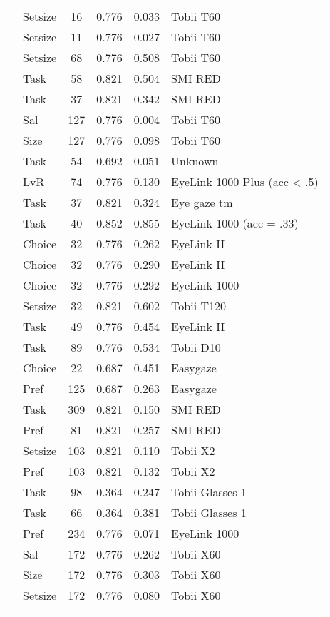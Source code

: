 \begin{longtable}{p{8cm}lcccl}
  \cite{orquin2020osfb} & Setsize & 16 & 0.776 & 0.033 & Tobii T60 \\ 
  \cite{orquin2020osfb} & Setsize & 11 & 0.776 & 0.027 & Tobii T60 \\ 
  \cite{orquin2020osfb} & Setsize & 68 & 0.776 & 0.508 & Tobii T60 \\ 
  \cite{paernamets2015a} & Task & 58 & 0.821 & 0.504 & SMI RED \\ 
  \cite{paernamets2015a} & Task & 37 & 0.821 & 0.342 & SMI RED \\ 
  \cite{peschel2019} & Sal & 127 & 0.776 & 0.004 & Tobii T60 \\ 
  \cite{peschel2019} & Size & 127 & 0.776 & 0.098 & Tobii T60 \\ 
  \cite{pieters1999} & Task & 54 & 0.692 & 0.051 & Unknown \\ 
  \cite{robertson2020} & LvR & 74 & 0.776 & 0.130 & EyeLink 1000 Plus (acc < .5) \\ 
  \cite{rubaltelli2012} & Task & 37 & 0.821 & 0.324 & Eye gaze tm \\ 
  \cite{schoemann2019} & Task & 40 & 0.852 & 0.855 & EyeLink 1000 (acc = .33) \\ 
  \cite{schotter2010a} & Choice & 32 & 0.776 & 0.262 & EyeLink II \\ 
  \cite{schotter2010a} & Choice & 32 & 0.776 & 0.290 & EyeLink II \\ 
  \cite{schotter2012a} & Choice & 32 & 0.776 & 0.292 & EyeLink 1000 \\ 
  \cite{spinks2016a} & Setsize & 32 & 0.821 & 0.602 & Tobii T120 \\ 
  \cite{su2013} & Task & 49 & 0.776 & 0.454 & EyeLink II \\ 
  \cite{turner2014} & Task & 89 & 0.776 & 0.534 & Tobii D10 \\ 
  \cite{vanderlaan2015} & Choice & 22 & 0.687 & 0.451 & Easygaze \\ 
  \cite{vanderlaan2017} & Pref & 125 & 0.687 & 0.263 & Easygaze \\ 
  \cite{vanherpen2011} & Task & 309 & 0.821 & 0.150 & SMI RED \\ 
  \cite{vanloo2015} & Pref & 81 & 0.821 & 0.257 & SMI RED \\ 
  \cite{vanloo2019} & Setsize & 103 & 0.821 & 0.110 & Tobii X2 \\ 
  \cite{vanloo2019} & Pref & 103 & 0.821 & 0.132 & Tobii X2 \\ 
  \cite{wastlund2015} & Task & 98 & 0.364 & 0.247 & Tobii Glasses 1 \\ 
  \cite{wastlund2015} & Task & 66 & 0.364 & 0.381 & Tobii Glasses 1 \\ 
  \cite{wolfson2017} & Pref & 234 & 0.776 & 0.071 & EyeLink 1000 \\ 
  \cite{zuschke2020} & Sal & 172 & 0.776 & 0.262 & Tobii X60 \\ 
  \cite{zuschke2020} & Size & 172 & 0.776 & 0.303 & Tobii X60 \\ 
  \cite{zuschke2020} & Setsize & 172 & 0.776 & 0.080 & Tobii X60 \\ 
  \hline
\label{tab:overviewtable}
\end{longtable}
